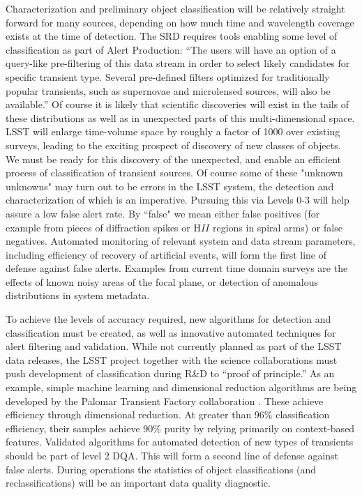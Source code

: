 \documentclass[SE,toc]{lsstdoc}
\begin{document}
Characterization and preliminary object classification will be relatively straight forward for many sources, depending on how much time and wavelength coverage exists at the time of detection. The SRD requires tools enabling some level of classification as part of Alert Production:  ``The users will have an option of a query-like pre-filtering of this data stream in order to select likely candidates for specific transient type. Several pre-defined filters optimized for traditionally popular transients, such as supernovae and microlensed sources, will also be available.''  Of course it is likely that scientific discoveries will exist in the tails of these distributions as well as in unexpected parts of this multi-dimensional space.  LSST will enlarge time-volume space by roughly a factor of 1000 over existing surveys, leading to the exciting prospect of discovery of new classes of objects.  We must be ready for this discovery of the unexpected, and enable an efficient process of classification of transient sources.  Of course some of these "unknown unknowns" may turn out to be errors in the LSST system, the detection and characterization of which is an imperative.  Pursuing this via Levels 0-3 will help assure a low false alert rate. By ``false" we mean either false positives (for example from pieces of diffraction spikes or H$II$ regions in spiral arms) or false negatives. Automated monitoring of relevant system and data stream parameters, including efficiency of recovery of artificial events, will form the first line of defense against false alerts. Examples from current time domain surveys are the effects of known noisy areas of the focal plane, or detection of anomalous distributions in system metadata.

To achieve the levels of accuracy required, new algorithms for detection and classification must be created, as well as innovative automated techniques for alert filtering and validation.  While not currently planned as part of the LSST data releases, the LSST project together with the science collaborations must push development of classification during R\&D to ``proof of principle.''  As an example, simple machine learning and dimensional reduction algorithms are being developed by the Palomar Transient Factory collaboration \citep{2012PASP..124.1175B}.  These achieve efficiency through dimensional reduction. At greater than 96\% classification efficiency, their samples achieve 90\% purity by relying primarily on context-based features. Validated algorithms for automated detection of new types of transients should be part of level 2 DQA. This will form a second line of defense against false alerts. During operations the statistics of object classifications (and reclassifications) will be an important data quality diagnostic.
\end{document}
